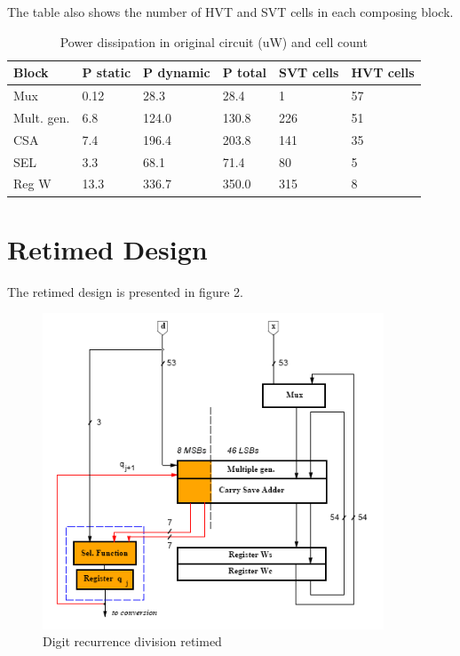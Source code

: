 \documentclass[11pt,a4paper]{article}
\begin{document}
The table also shows the number of HVT and SVT cells in each composing block.

\begin{table}[htbp]
\caption{Power dissipation in original circuit (uW) and cell count}
\begin{center}
\begin{tabular}{|l|l|l|l|l|l|} %
\hline
\textbf{Block}	& \textbf{P static}		& \textbf{P dynamic}	& \textbf{P total} & \textbf{SVT cells} & \textbf{HVT cells}\\ \hline
Mux & 0.12 & 28.3 & 28.4 & 1 & 57 	\\ \hline
Mult. gen. & 6.8 & 124.0 & 130.8 & 226 & 51 	\\ \hline
CSA & 7.4 & 196.4 & 203.8 & 141 & 35 	\\ \hline
SEL & 3.3 & 68.1 & 71.4 & 80 & 5 	\\ \hline
Reg W & 13.3 & 336.7 & 350.0 & 315 & 8 	\\ \hline
\end{tabular}
\end{center}
\label{table:powerOriginal}
\end{table}


\section{Retimed Design}
The retimed design is presented in figure 2.

\begin{figure}
	\centering
		\includegraphics[width=4in]{./retiming.PNG}
	\caption{Digit recurrence division retimed}
	\label{fig:retiming}
\end{figure}
\end{document}
